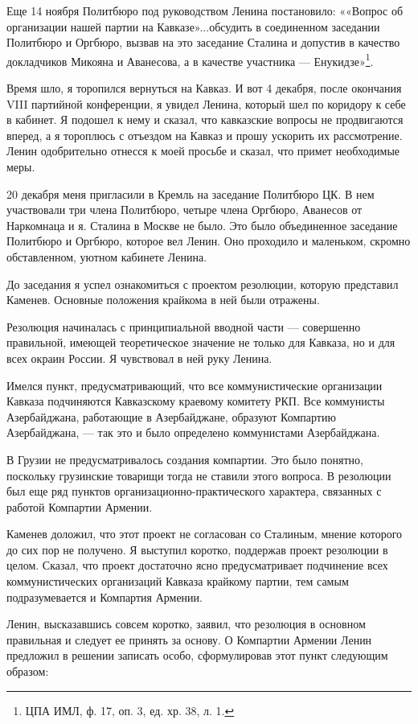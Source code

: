\documentclass[12pt, a4paper, openany]{book}
\begin{document}
Еще 14 ноября Политбюро под руководством Ленина постановило: ««Вопрос об организации нашей партии на Кавказе»...обсудить в соединенном заседании Политбюро и Оргбюро, вызвав на это заседание Сталина и допустив в качество докладчиков Микояна и Аванесова, а в качестве участника — Енукидзе»\footnote{ЦПА ИМЛ, ф. 17, оп. 3, ед. хр. 38, л. 1.}.

Время шло, я торопился вернуться на Кавказ. И вот 4 декабря, после окончания VIII партийной конференции, я увидел Ленина, который шел по коридору к себе в кабинет. Я подошел к нему и сказал, что кавказские вопросы не продвигаются вперед, а я тороплюсь с отъездом на Кавказ и прошу ускорить их рассмотрение. Ленин одобрительно отнесся к моей просьбе и сказал, что примет необходимые меры.

20 декабря меня пригласили в Кремль на заседание Политбюро ЦК. В нем участвовали три члена Политбюро, четыре члена Оргбюро, Аванесов от Наркомнаца и я. Сталина в Москве не было. Это было объединенное заседание Политбюро и Оргбюро, которое вел Ленин. Оно проходило и маленьком, скромно обставленном, уютном кабинете Ленина.

До заседания я успел ознакомиться с проектом резолюции, которую представил Каменев. Основные положения крайкома в ней были отражены.

Резолюция начиналась с принципиальной вводной части — совершенно правильной, имеющей теоретическое значение не только для Кавказа, но и для всех окраин России. Я чувствовал в ней руку Ленина.

Имелся пункт, предусматривающий, что все коммунистические организации Кавказа подчиняются Кавказскому краевому комитету РКП. Все коммунисты Азербайджана, работающие в Азербайджане, образуют Компартию Азербайджана, — так это и было определено коммунистами Азербайджана.

В Грузии не предусматривалось создания компартии. Это было понятно, поскольку грузинские товарищи тогда не ставили этого вопроса. В резолюции был еще ряд пунктов организационно-практического характера, связанных с работой Компартии Армении.

Каменев доложил, что этот проект не согласован со Сталиным, мнение которого до сих пор не получено. Я выступил коротко, поддержав проект резолюции в целом. Сказал, что проект достаточно ясно предусматривает подчинение всех коммунистических организаций Кавказа крайкому партии, тем самым подразумевается и Компартия Армении.

Ленин, высказавшись совсем коротко, заявил, что резолюция в основном правильная и следует ее принять за основу. О Компартии Армении Ленин предложил в решении записать особо, сформулировав этот пункт следующим образом:
\end{document}
